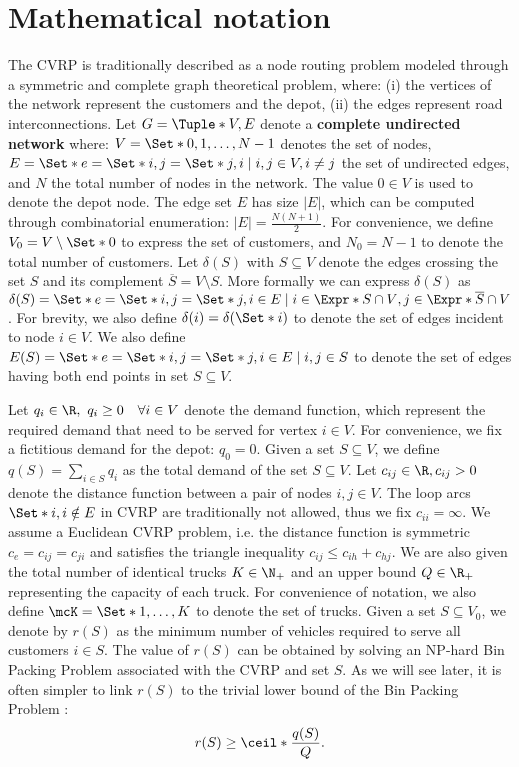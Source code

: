 \section{Mathematical notation}
\label{sec:cvrp-mathematical-notation}

The CVRP is traditionally described as a node routing problem
modeled through a symmetric and complete graph theoretical problem,
where: (i) the vertices of the network represent the customers and the depot,
(ii) the edges represent road interconnections.
Let $G = \Tuple*{V, E}$ denote a \textbf{complete undirected network} where:
$V = \Set*{0, 1, \dots, N - 1}$ denotes the set of nodes,
$E = \Set*{e = \Set*{i, j} = \Set*{j, i} \mid \allowbreak i,j \in V, \allowbreak i \ne j}$  the set of undirected edges,
and $N$ the total number of nodes in the network.
The value $0 \in V$ is used to denote the depot node.
The edge set $E$ has size $|E|$, which can be computed through combinatorial enumeration: $|E| = \frac{N (N+1)}{2}$.
For convenience, we define $V_0 = V \setminus \Set*{0}$ to express the set of customers,
and $N_0 = N - 1$ to denote the total number of customers.
Let $\delta(S)$ with $S \subseteq V$ denote
the edges crossing the set $S$ and its complement $\overline{S} = V \setminus S$.
More formally we can express $\delta(S)$ as
$\delta(S) = \Set*{ e = \Set*{i, j} = \Set*{j, i} \in E \mid i \in \Expr*{S \cap V}, j \in \Expr*{ \overline{S} \cap V } }$.
For brevity, we also define $\delta(i) = \delta(\Set*{i})$ to denote the set of edges incident to node $i \in V$.
We also define $E(S) = \Set*{e = \Set*{i, j} = \Set*{j, i}\in E \mid i, j \in S}$
to denote the set of edges having both end points in set $S \subseteq V$.

Let $q_{i} \in \R,\ q_{i} \ge 0 \quad \forall i \in V$ denote the demand function,
which represent the required demand that need to be served for vertex $i \in V$.
For convenience, we fix a fictitious demand for the depot: $q_0 = 0$.
Given a set $S \subseteq V$, we define $q(S) = \sum_{i \in S} q_i$ as the total demand of the set $S \subseteq V$.
Let $c_{ij} \in \R, c_{ij} > 0$ denote the distance function between a pair of nodes  $i, j \in V$.
The loop arcs $\Set*{i, i} \notin E$ in CVRP are traditionally not allowed, thus we fix $c_{ii} = \infty$.
We assume a Euclidean CVRP problem, i.e. the distance function is symmetric $c_e = c_{ij} = c_{ji}$
and satisfies the triangle inequality $c_{ij} \le c_{ih} + c_{hj}$.
We are also given the total number of identical trucks $K \in \N_+$
and an upper bound $Q \in \R_+$ representing the capacity of each truck.
For convenience of notation, we also define $\mcK = \Set*{1, \dots, K}$ to denote the set of trucks.
Given a set $S \subseteq V_0$,
we denote by $r(S)$ as the minimum number of vehicles required to serve all customers $i \in S$.
The value of $r(S)$ can be obtained by solving an NP-hard Bin Packing Problem associated with the CVRP and set $S$.
As we will see later,
it is often simpler to link $r(S)$ to the trivial lower bound of the Bin Packing Problem \parencite{martello1990, martello1990knapsack}:
\begin{equation}
	r(S) \ge \ceil*{\frac{q(S)}{Q}}.
\end{equation}

